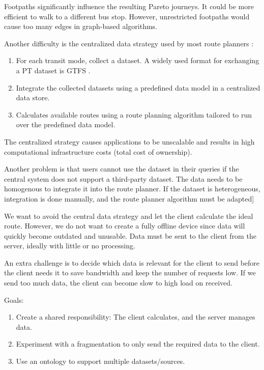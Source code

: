 Footpaths significantly influence the resulting Pareto journeys. It could be more efficient to walk to a different bus stop. However, unrestricted footpaths would cause too many edges in graph-based algorithms.

Another difficulty is the centralized data strategy used by most route planners \cite{rojas_melendez_julian_andres_decentralized_2020}:
\begin{enumerate}
    \item For each transit mode, collect a dataset. A widely used format for exchanging a PT dataset is GTFS \cite{noauthor_gtfs_2022}.
    \item Integrate the collected datasets using a predefined data model in a centralized data store.
    \item Calculates available routes using a route planning algorithm tailored to run over the predefined data model.
\end{enumerate}
The centralized strategy causes applications to be unscalable and results in high computational infrastructure costs (total cost of ownership). 

Another problem is that users cannot use the dataset in their queries if the central system does not support a third-party dataset. The data needs to be homogenous to integrate it into the route planner. If the dataset is heterogeneous, integration is done manually, and the route planner algorithm must be adapted]


We want to avoid the central data strategy and let the client calculate the ideal route. However, we do not want to create a fully offline device since data will quickly become outdated and unusable. Data must be sent to the client from the server, ideally with little or no processing. 

An extra challenge is to decide which data is relevant for the client to send before the client needs it to save bandwidth and keep the number of requests low. If we send too much data, the client can become slow to high load on received.
 
Goals:
\begin{enumerate}
    \item Create a shared responsibility: The client calculates, and the server manages data.
    \item Experiment with a fragmentation to only send the required data to the client.
    \item Use an ontology to support multiple datasets/sources.
\end{enumerate}


